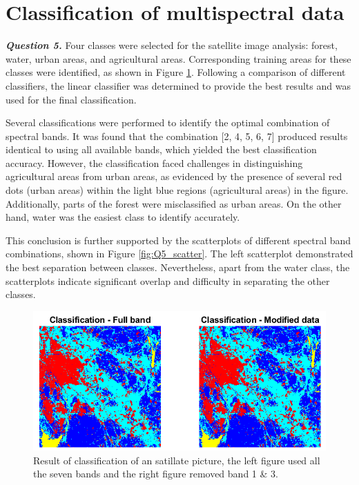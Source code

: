 \documentclass[12pt]{article}
\begin{document}
\section{Classification of multispectral data}
\textbf{\emph{Question 5.}}
Four classes were selected for the satellite image analysis: forest, water, urban areas, and agricultural areas. Corresponding training areas for these classes were identified, as shown in Figure \ref{fig:Q5_res}. Following a comparison of different classifiers, the linear classifier was determined to provide the best results and was used for the final classification.

Several classifications were performed to identify the optimal combination of spectral bands. It was found that the combination [2, 4, 5, 6, 7] produced results identical to using all available bands, which yielded the best classification accuracy. However, the classification faced challenges in distinguishing agricultural areas from urban areas, as evidenced by the presence of several red dots (urban areas) within the light blue regions (agricultural areas) in the figure. Additionally, parts of the forest were misclassified as urban areas. On the other hand, water was the easiest class to identify accurately.

This conclusion is further supported by the scatterplots of different spectral band combinations, shown in Figure \ref{fig:Q5_scatter}. The left scatterplot demonstrated the best separation between classes. Nevertheless, apart from the water class, the scatterplots indicate significant overlap and difficulty in separating the other classes.
\begin{figure}[h!]
  \centering
  \includegraphics[width = 15cm]{images/Q5_result.png}
  \caption{Result of classification of an satillate picture, the left figure used all the seven bands and the right figure removed band 1 \& 3.}
  \label{fig:Q5_res}
\end{figure}
\end{document}
